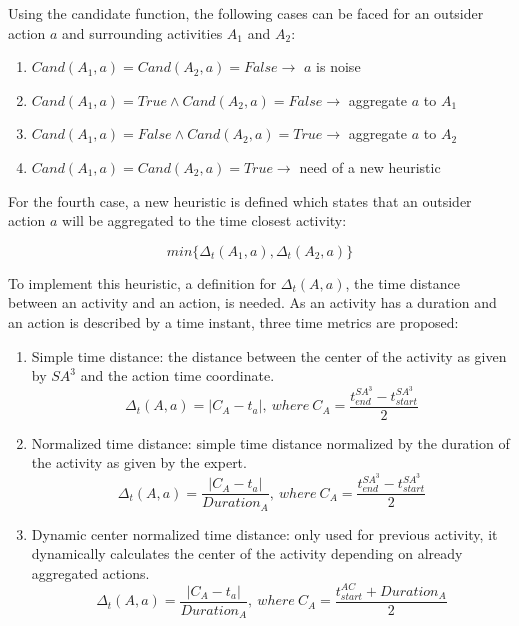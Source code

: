 Using the candidate function, the following cases can be faced for an outsider action $a$ and surrounding activities $A_1$ and $A_2$:

\begin{enumerate}
 \item $Cand(A_1, a) = Cand(A_2, a) = False \rightarrow$ $a$ is noise
 \item $Cand(A_1, a) = True \wedge Cand(A_2, a) = False \rightarrow$ aggregate $a$ to $A_1$
 \item $Cand(A_1, a) = False \wedge Cand(A_2, a) = True \rightarrow$ aggregate $a$ to $A_2$
 \item $Cand(A_1, a) = Cand(A_2, a) = True \rightarrow$ need of a new heuristic
\end{enumerate}

For the fourth case, a new heuristic is defined which states that an outsider action $a$ will be aggregated to the time closest activity:

\begin{equation}
 min\{\Delta_t(A_1, a), \Delta_t(A_2, a)\}
\end{equation}

To implement this heuristic, a definition for $\Delta_t(A, a)$, the time distance between an activity and an action, is needed. As an activity has a duration and an action is described by a time instant, three time metrics are proposed:

\begin{enumerate}
 \item Simple time distance: the distance between the center of the activity as given by $SA^3$ and the action time coordinate.
 \begin{equation}
 \label{eq-t1}
  \Delta_t(A, a) = | C_A - t_a |,\ where \ C_A = \frac{t_{end} ^{SA^3} - t_{start} ^{SA^3}}{2}
 \end{equation}
 \item Normalized time distance: simple time distance normalized by the duration of the activity as given by the expert.
 \begin{equation}
 \label{eq-t2}
  \Delta_t(A, a) = \frac{| C_A - t_a |}{Duration_A} ,\ where \ C_A = \frac{t_{end} ^{SA^3} - t_{start} ^{SA^3}}{2}
 \end{equation}
 \item Dynamic center normalized time distance: only used for previous activity, it dynamically calculates the center of the activity depending on already aggregated actions.
 \begin{equation}
 \label{eq-t3}
  \Delta_t(A, a) = \frac{| C_A - t_a |}{Duration_A} ,\ where \ C_A = \frac{t_{start} ^{AC} + Duration_A}{2}
 \end{equation}
\end{enumerate}


